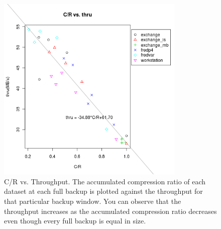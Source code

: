 \begin{figure}[!t]
\centering
\includegraphics[width=0.8\textwidth]{figure/dedup/full018}
\captionsetup{format=myformat}
\caption{C/R vs. Throughput. The accumulated compression ratio of each dataset at each full backup is plotted against the throughput for that particular backup window. You can observe that the throughput increases as the accumulated compression ratio decreases even though every full backup is equal in size.}
\label{compthru}
\end{figure}

